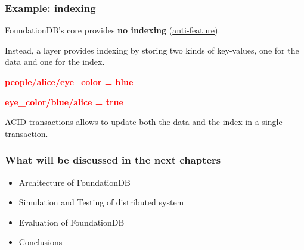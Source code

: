 
\begin{frame}
	\frametitle{Example: indexing}

FoundationDB’s core provides \textbf{no indexing}  (\href{https://apple.github.io/foundationdb/anti-features.html}{anti-feature}).

Instead, a layer provides indexing by storing two kinds of key-values, one for the data and one for the index.

\begin{center}
\textbf{\textcolor{red}{people/alice/eye\_color = blue}}
\end{center}

\begin{center}
\textbf{\textcolor{red}{eye\_color/blue/alice = true}}
\end{center}

ACID transactions allows to update both the data and the index in a single transaction.
\end{frame}







\begin{frame}
	\frametitle{What will be discussed in the next chapters}

    \begin{itemize}
        \item Architecture of FoundationDB
        \item Simulation and Testing of distributed system
        \item Evaluation of FoundationDB
        \item Conclusions
    \end{itemize}
        
\end{frame}



